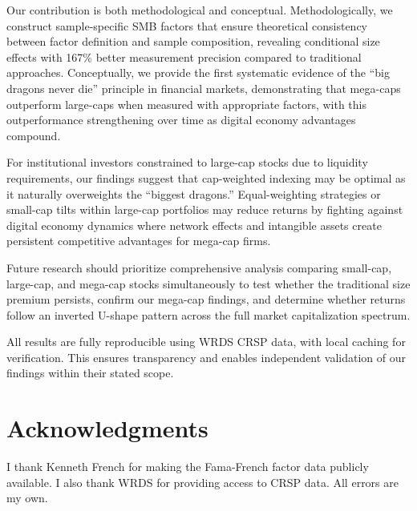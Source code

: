 \documentclass[10pt,letterpaper]{article}
\begin{document}
Our contribution is both methodological and conceptual. Methodologically, we construct sample-specific SMB factors that ensure theoretical consistency between factor definition and sample composition, revealing conditional size effects with 167\% better measurement precision compared to traditional approaches. Conceptually, we provide the first systematic evidence of the ``big dragons never die'' principle in financial markets, demonstrating that mega-caps outperform large-caps when measured with appropriate factors, with this outperformance strengthening over time as digital economy advantages compound.

For institutional investors constrained to large-cap stocks due to liquidity requirements, our findings suggest that cap-weighted indexing may be optimal as it naturally overweights the ``biggest dragons.'' Equal-weighting strategies or small-cap tilts within large-cap portfolios may reduce returns by fighting against digital economy dynamics where network effects and intangible assets create persistent competitive advantages for mega-cap firms.

Future research should prioritize comprehensive analysis comparing small-cap, large-cap, and mega-cap stocks simultaneously to test whether the traditional size premium persists, confirm our mega-cap findings, and determine whether returns follow an inverted U-shape pattern across the full market capitalization spectrum.

All results are fully reproducible using WRDS CRSP data, with local caching for verification. This ensures transparency and enables independent validation of our findings within their stated scope.

\clearpage
\section*{Acknowledgments}

I thank Kenneth French for making the Fama-French factor data publicly available. I also thank WRDS for providing access to CRSP data. All errors are my own.

\nolinenumbers


\end{document}
